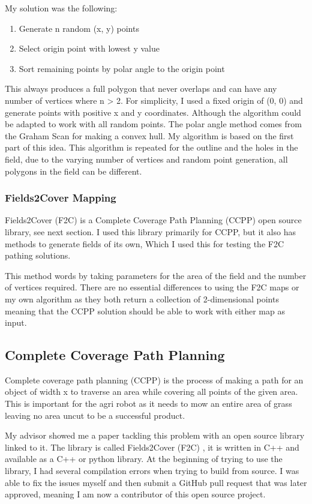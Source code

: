 \documentclass[progress]{cmpreport}
\begin{document}
My solution was the following:
\begin{enumerate}
	\item{Generate n random (x, y) points}
	\item{Select origin point with lowest y value}
	\item{Sort remaining points by polar angle to the origin point}
\end{enumerate}

This always produces a full polygon that never overlaps and can have any number of vertices where n > 2.
For simplicity, I used a fixed origin of (0, 0) and generate points with positive x and y coordinates. Although the algorithm could be adapted to work with all random points.
The polar angle method comes from the Graham Scan for making a convex hull. My algorithm is based on the first part of this idea.
This algorithm is repeated for the outline and the holes in the field, due to the varying number of vertices and random point generation, all polygons in the field can be different.


\subsubsection{Fields2Cover Mapping}
Fields2Cover (F2C) is a Complete Coverage Path Planning (CCPP) open source library, see next section.
I used this library primarily for CCPP, but it also has methods to generate fields of its own,
Which I used this for testing the F2C pathing solutions.

This method words by taking parameters for the area of the field and the number of vertices required.
There are no essential differences to using the F2C maps or my own algorithm as they both return a collection of 2-dimensional points meaning that the CCPP solution should be able to work with either map as input.

\subsection{Complete Coverage Path Planning}
Complete coverage path planning (CCPP) is the process of making a path for an object of width x to traverse an area while covering all points of the given area.
This is important for the agri robot as it needs to mow an entire area of grass leaving no area uncut to be a successful product.

My advisor showed me a paper tackling this problem with an open source library linked to it.
The library is called Fields2Cover (F2C) \cite{fields2cover2023github}, it is written in C++ and available as a C++ or python library.
At the beginning of trying to use the library, I had several compilation errors when trying to build from source.
I was able to fix the issues myself and then submit a GitHub pull request that was later approved, meaning I am now a contributor of this open source project.
\end{document}
